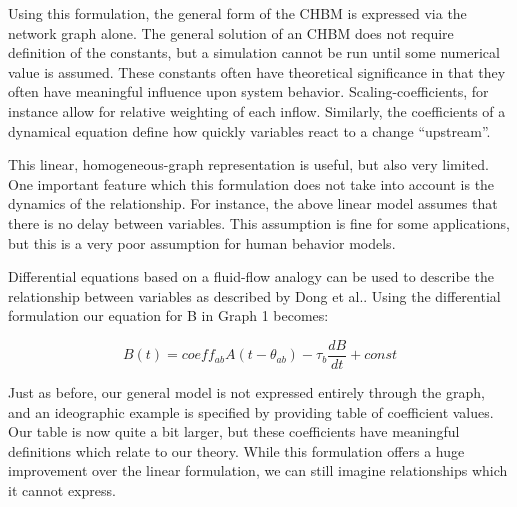 \documentclass[runningheads,a4paper]{llncs}
\begin{document}
Using this formulation, the general form of the CHBM is expressed via the network graph alone.
The general solution of an CHBM does not require definition of the constants, but a simulation cannot be run until some numerical value is assumed. 
These constants often have theoretical significance in that they often have meaningful influence upon system behavior. 
Scaling-coefficients, for instance allow for relative weighting of each inflow. 
Similarly, the coefficients of a dynamical equation define how quickly variables react to a change ``upstream''.

This linear, homogeneous-graph representation is useful, but also very limited.
One important feature which this formulation does not take into account is the dynamics of the relationship.
For instance, the above linear model assumes that there is no delay between variables.
This assumption is fine for some applications, but this is a very poor assumption for human behavior models. 

Differential equations based on a fluid-flow analogy can be used to describe the relationship between variables as described by Dong et al.\cite{dongrivera2012dynamical}. 
Using the differential formulation our equation for B in Graph 1 becomes:

\begin{equation}
    B(t) = coeff_{ab}A(t-\theta_{ab}) - \tau_{b}\frac{dB}{dt} + const
    \label{fluid-flow-eq}
\end{equation}

Just as before, our general model is not expressed entirely through the graph, and an  ideographic example is specified by providing table of coefficient values.
Our table is now quite a bit larger, but these coefficients have meaningful definitions which relate to our theory.
While this formulation offers a huge improvement over the linear formulation, we can still imagine relationships which it cannot express.
\end{document}
